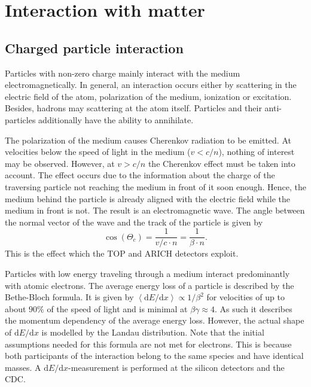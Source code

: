 \section{Interaction with matter}
\label{sec:interaction_with_matter}

\subsection{Charged particle interaction}
\label{sec:interaction_with_matter}

Particles with non-zero charge mainly interact with the medium electromagnetically. In general, an interaction occurs either by scattering in the electric field of the atom, polarization of the medium, ionization or excitation. Besides, hadrons may scattering at the atom itself. Particles and their anti-particles additionally have the ability to annihilate.

The polarization of the medium causes Cherenkov radiation to be emitted. At velocities below the speed of light in the medium ($v < c/n$), nothing of interest may be observed. However, at $v > c/n$ the Cherenkov effect must be taken into account. The effect occurs due to the information about the charge of the traversing particle not reaching the medium in front of it soon enough. Hence, the medium behind the particle is already aligned with the electric field while the medium in front is not. The result is an electromagnetic wave. The angle between the normal vector of the wave and the track of the particle is given by
\begin{equation}
	\cos(\Theta_{c}) = \frac{1}{v/c \cdot n} = \frac{1}{\beta \cdot n}
	\mathrm{.}
\end{equation}
This is the effect which the TOP and ARICH detectors exploit.

Particles with low energy traveling through a medium interact predominantly with atomic electrons. The average energy loss of a particle is described by the Bethe-Bloch formula. It is given by $\left< \mathrm{d}E/\mathrm{d}x \right> \propto 1/{\beta^2}$ for velocities of up to about $90\%$ of the speed of light and is minimal at $\beta \gamma \approx 4$. As such it describes the momentum dependency of the average energy loss. However, the actual shape of $\mathrm{d}E/\mathrm{d}x$ is modelled by the Landau distribution. Note that the initial assumptions needed for this formula are not met for electrons. This is because both participants of the interaction belong to the same species and have identical masses.
A $\mathrm{d}E/\mathrm{d}x$-measurement is performed at the silicon detectors and the CDC.

